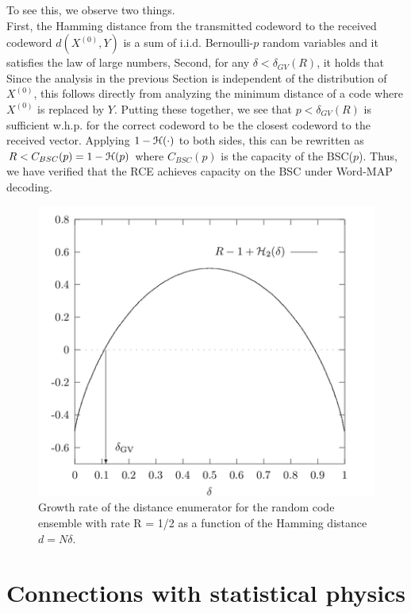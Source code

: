 \documentclass[letterpaper,english,10pt]{article}
\begin{document}
To see this, we observe two things. \\
First, the Hamming distance from the transmitted codeword to the received codeword $d(X^{(0)},Y)$ is a sum of i.i.d. Bernoulli-$p$ random variables and it satisfies the law of large numbers, 
Second, for any $\delta < \delta_{GV}(R)$, it holds that 
Since the analysis in the previous Section is independent of the distribution of $X^{(0)}$, 
this follows directly from analyzing the minimum distance of a code where $X^{(0)}$ is replaced by $Y$. 
Putting these together, we see that $p < \delta_{GV}(R)$ is sufficient w.h.p. for the correct codeword to be the closest codeword to the received vector. 
Applying $1 - \mathcal{H}(\cdot)$ to both sides, 
this can be rewritten as $R < C_{BSC}(p) = 1- \mathcal{H}(p)$ where $C_{BSC}(p)$ is the capacity of the BSC($p$). 
Thus, we have verified that the RCE achieves capacity on the BSC under Word-MAP decoding.
\begin{figure}
    \centering
    \includegraphics[scale=0.6]{Lectures/2019/Figures/RCE.png}
    \caption{Growth rate of the distance enumerator for the random code ensemble
with rate R = 1/2 as a function of the Hamming distance $d = N\delta$.}
    \label{fig:my_label}
\end{figure}

\section{Connections with statistical physics}
\end{document}
